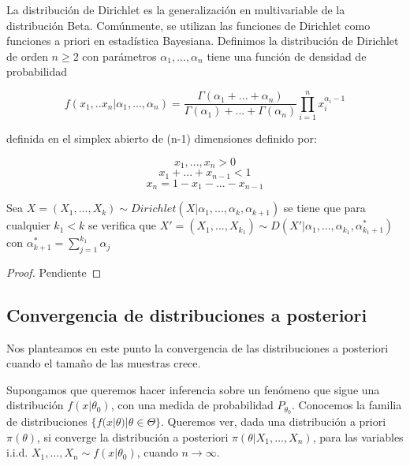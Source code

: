 \documentclass{article}
\begin{document}
La distribución de Dirichlet es la generalización en multivariable de la distribución Beta. Comúnmente, se utilizan las funciones de Dirichlet como funciones a priori en estadística Bayesiana. Definimos la distribución de Dirichlet de orden $n \geq 2$ con parámetros $\alpha_1, ..., \alpha_n$ tiene una función de densidad de probabilidad

\begin{equation*}
f(x_1, .. x_n|\alpha_1, ...,\alpha_n) = \frac{\Gamma(\alpha_1 + ... + \alpha_n)}{\Gamma(\alpha_1) + ... + \Gamma(\alpha_n)} \prod_{i=1}^{n} {x_i ^ {\alpha_i - 1}}
\end{equation*}

definida en el simplex abierto de (n-1) dimensiones definido por:

\begin{equation*}
x_1, ... , x_n > 0
\end{equation*}
\begin{equation*}
x_1 + ... + x_{n-1} < 1
\end{equation*}
\begin{equation*}
x_n =  1 - x_1 - ... - x_{n-1}
\end{equation*}

\begin{thm}
	Sea $X = (X_1, ... , X_k) \sim Dirichlet(X|\alpha_1, ... , \alpha_k, \alpha_{k+1}) $ se tiene que para cualquier $k_1 < k$  se verifica que $X' =  (X_1, ... , X_{k_1}) \sim D(X'|\alpha_1, ... , \alpha_{k_1}, \alpha_{k_1 + 1}^{*}) $ con  $\alpha_{k+1}^{*} =\sum_{j=1}^{k_1} {\alpha_{j}}$
\end{thm}

\begin{proof}
	Pendiente
\end{proof}

\subsection{Convergencia de distribuciones a posteriori}

Nos planteamos en este punto la convergencia de las distribuciones a posteriori cuando el tamaño de las muestras crece.

Supongamos que queremos hacer inferencia sobre un fenómeno que sigue una distribución $f(x|\theta_0)$, con una medida de probabilidad $P_{\theta_0}$. Conocemos la familia de distribuciones $\{f(x|\theta)|\theta\in\Theta\}$. Queremos ver, dada una distribución a priori $\pi(\theta)$, si converge la distribución a posteriori $\pi(\theta|X_1,\dots,X_n)$, para las variables i.i.d. $X_1,\dots,X_n \sim f(x|\theta_0)$,  cuando $n \to \infty$.
\end{document}
